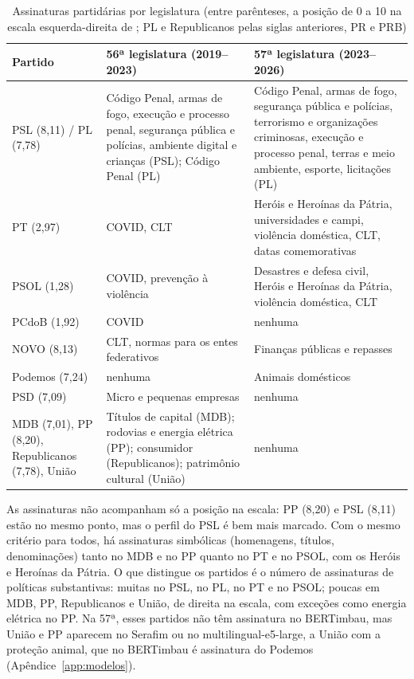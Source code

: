\documentclass[12pt]{article}
\newcommand{\tabfont}{\fontsize{9}{11}\selectfont\setlength{\tabcolsep}{2.5pt}}
\begin{document}
\begin{table}[tbp]
\centering
\caption{Assinaturas partidárias por legislatura (entre parênteses, a posição de 0 a 10 na escala esquerda-direita de \citet{bolognesi2023nova}; PL e Republicanos pelas siglas anteriores, PR e PRB)}
\label{tab:rq2}
\tabfont
\begin{tabularx}{\textwidth}{>{\raggedright\arraybackslash}p{3.0cm} >{\raggedright\arraybackslash}X >{\raggedright\arraybackslash}X}
\toprule
\textbf{Partido} & \textbf{56ª legislatura (2019--2023)} & \textbf{57ª legislatura (2023--2026)} \\
\midrule
PSL (8,11) / PL (7,78) & Código Penal, armas de fogo, execução e processo penal, segurança pública e polícias, ambiente digital e crianças (PSL); Código Penal (PL) & Código Penal, armas de fogo, segurança pública e polícias, terrorismo e organizações criminosas, execução e processo penal, terras e meio ambiente, esporte, licitações (PL) \\
\midrule
PT (2,97) & COVID, CLT & Heróis e Heroínas da Pátria, universidades e campi, violência doméstica, CLT, datas comemorativas \\
\midrule
PSOL (1,28) & COVID, prevenção à violência & Desastres e defesa civil, Heróis e Heroínas da Pátria, violência doméstica, CLT \\
\midrule
PCdoB (1,92) & COVID & nenhuma \\
\midrule
NOVO (8,13) & CLT, normas para os entes federativos & Finanças públicas e repasses \\
\midrule
Podemos (7,24) & nenhuma & Animais domésticos \\
\midrule
PSD (7,09) & Micro e pequenas empresas & nenhuma \\
\midrule
MDB (7,01), PP (8,20), Republicanos (7,78), União & Títulos de capital (MDB); rodovias e energia elétrica (PP); consumidor (Republicanos); patrimônio cultural (União) & nenhuma \\
\bottomrule
\end{tabularx}
\end{table}

As assinaturas não acompanham só a posição na escala: PP (8,20) e PSL (8,11) estão no mesmo ponto, mas o perfil do PSL é bem mais marcado. Com o mesmo critério para todos, há assinaturas simbólicas (homenagens, títulos, denominações) tanto no MDB e no PP quanto no PT e no PSOL, com os Heróis e Heroínas da Pátria. O que distingue os partidos é o número de assinaturas de políticas substantivas: muitas no PSL, no PL, no PT e no PSOL; poucas em MDB, PP, Republicanos e União, de direita na escala, com exceções como energia elétrica no PP. Na 57ª, esses partidos não têm assinatura no BERTimbau, mas União e PP aparecem no Serafim ou no multilingual-e5-large, a União com a proteção animal, que no BERTimbau é assinatura do Podemos (Apêndice~\ref{app:modelos}).
\end{document}
